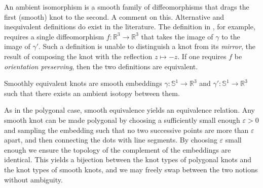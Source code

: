     An ambient isomorphism is a smooth family of diffeomorphisms that
    drags the first (smooth) knot to the second. A comment on this.
    Alternative and inequivalent definitions do exist in the literature.
    The definition in \cite[p.~4]{CrowellFoxKnotTheory}, for example,
    requires a single diffeomorphism
    $f:\mathbb{R}^{3}\rightarrow\mathbb{R}^{3}$ that
    takes the image of $\gamma$ to the image of $\gamma'$. Such a
    definition is unable to distinguish a knot from its \textit{mirror},
    the result of composing the knot with the reflection $z\mapsto{-z}$.
    If one requires $f$ be \textit{orientation preserving}, then the
    two definitions are equivalent.
    \begin{definition}
        Smoothly equivalent knots are smooth embeddings
        $\gamma:\mathbb{S}^{1}\rightarrow\mathbb{R}^{3}$ and
        $\gamma':\mathbb{S}^{1}\rightarrow\mathbb{R}^{3}$ such that there
        exists an ambient isotopy between them.
    \end{definition}
    As in the polygonal case, smooth equivalence yields an equivalence
    relation. Any smooth knot can be made polygonal by choosing a sufficiently
    small enough $\varepsilon>0$ and sampling the embedding such that no two
    successive points are more than $\varepsilon$ apart, and then connecting
    the dots with line segments. By choosing $\varepsilon$ small enough we
    ensure the topology of the complement of the embeddings are identical. This
    yields a bijection between the knot types of polygonal knots and the
    knot types of smooth knots, and we may freely swap between the two notions
    without ambiguity.

